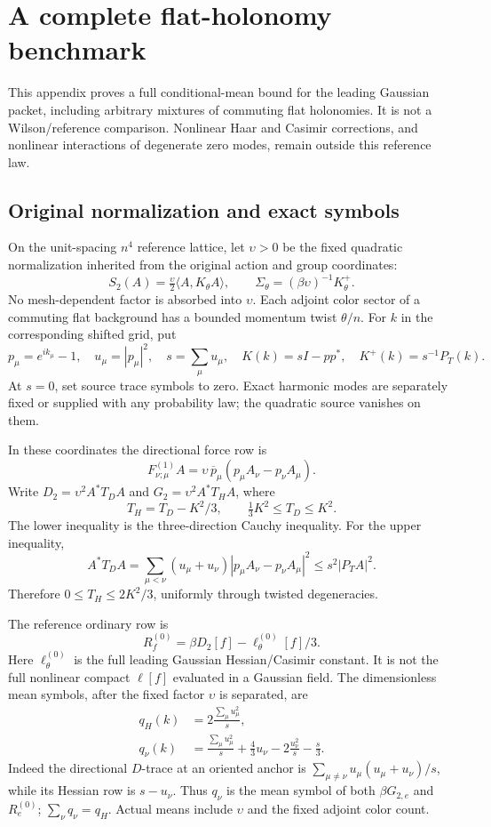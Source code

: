\documentclass[11pt,letterpaper]{article}
\theoremstyle{remark}\newtheorem{remark}[theorem]{Remark}
\begin{document}
\clearpage
\appendix
\section{A complete flat-holonomy benchmark}\label{app:flat}

This appendix proves a full conditional-mean bound for the leading Gaussian packet, including arbitrary mixtures of commuting flat holonomies. It is not a Wilson/reference comparison. Nonlinear Haar and Casimir corrections, and nonlinear interactions of degenerate zero modes, remain outside this reference law.

\subsection{Original normalization and exact symbols}

On the unit-spacing \(n^4\) reference lattice, let \(\upsilon>0\) be the fixed quadratic normalization inherited from the original action and group coordinates:
\[
 S_2(A)=\tfrac{\upsilon}{2}\langle A,K_\theta A\rangle,\qquad
 \Sigma_\theta=(\beta\upsilon)^{-1}K_\theta^+.
\]
No mesh-dependent factor is absorbed into \(\upsilon\). Each adjoint color sector of a commuting flat background has a bounded momentum twist \(\theta/n\). For \(k\) in the corresponding shifted grid, put
\[
 p_\mu=e^{ik_\mu}-1,\quad
 u_\mu=|p_\mu|^2,\quad s=\sum_\mu u_\mu,\quad
 K(k)=sI-pp^*,\quad K^+(k)=s^{-1}P_T(k).
\]
At \(s=0\), set source trace symbols to zero. Exact harmonic modes are separately fixed or supplied with any probability law; the quadratic source vanishes on them.

In these coordinates the directional force row is
\[
 F^{(1)}_{\nu;\mu}A
 =\upsilon\,\overline p_\mu(p_\mu A_\nu-p_\nu A_\mu).
\]
Write \(D_2=\upsilon^2A^*T_DA\) and
\(G_2=\upsilon^2A^*T_HA\), where
\[
 T_H=T_D-K^2/3,\qquad \tfrac13K^2\le T_D\le K^2.
\]
The lower inequality is the three-direction Cauchy inequality. For the upper inequality,
\[
 A^*T_DA
 =\sum_{\mu<\nu}(u_\mu+u_\nu)
       |p_\mu A_\nu-p_\nu A_\mu|^2
 \le s^2|P_TA|^2.
\]
Therefore \(0\le T_H\le2K^2/3\), uniformly through twisted degeneracies.

The reference ordinary row is
\[
 R_f^{(0)}=\beta D_2[f]-\ell_\theta^{(0)}[f]/3.
\]
Here \(\ell_\theta^{(0)}\) is the full leading Gaussian Hessian/Casimir constant. It is not the full nonlinear compact \(\ell[f]\) evaluated in a Gaussian field.
The dimensionless mean symbols, after the fixed factor \(\upsilon\) is separated, are
\begin{align}\label{eq:symbol}
 q_H(k)&=2\frac{\sum_\mu u_\mu^2}{s},\\
 q_\nu(k)&=\frac{\sum_\mu u_\mu^2}{s}
 +\frac43u_\nu-2\frac{u_\nu^2}{s}-\frac{s}{3}.
\end{align}
Indeed the directional \(D\)-trace at an oriented anchor is
\(\sum_{\mu\ne\nu}u_\mu(u_\mu+u_\nu)/s\), while its Hessian row is \(s-u_\nu\). Thus \(q_\nu\) is the mean symbol of both \(\beta G_{2,e}\) and \(R_e^{(0)}\); \(\sum_\nu q_\nu=q_H\). Actual means include \(\upsilon\) and the fixed adjoint color count.
\end{document}
